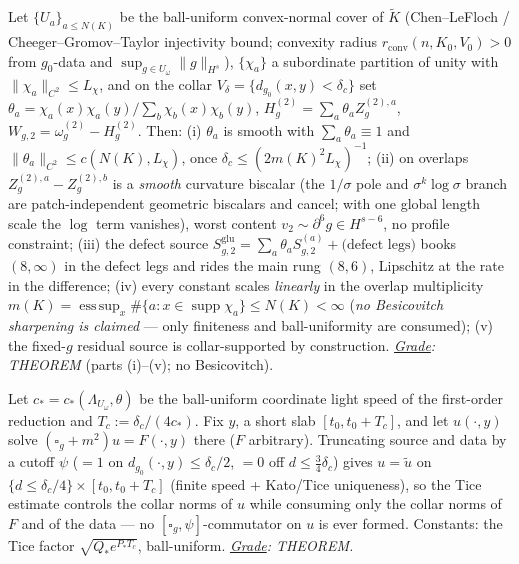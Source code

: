 \begin{lemma}[Collar gluing of the $N{=}2$ parametrix; defect bookkeeping;
honest multiplicity]\label{an17:G}
Let $\{U_a\}_{a\le N(K)}$ be the ball-uniform convex-normal cover of
$\widetilde K$ (Chen--LeFloch / Cheeger--Gromov--Taylor injectivity bound;
convexity radius $r_{\mathrm{conv}}(n,K_0,V_0)>0$ from $g_0$-data and
$\sup_{g\in U_\omega}\|g\|_{H^s}$), $\{\chi_a\}$ a subordinate partition of unity
with $\|\chi_a\|_{C^2}\le L_\chi$, and on the collar
$V_\delta=\{d_{g_0}(x,y)<\delta_c\}$ set
$\theta_a=\chi_a(x)\chi_a(y)/\sum_b\chi_b(x)\chi_b(y)$,
$H^{(2)}_g=\sum_a\theta_a Z^{(2),a}_g$, $W_{g,2}=\omega^{(2)}_g-H^{(2)}_g$. Then:
(i) $\theta_a$ is smooth with $\sum_a\theta_a\equiv1$ and
$\|\theta_a\|_{C^2}\le c(N(K),L_\chi)$, once $\delta_c\le(2m(K)^2 L_\chi)^{-1}$;
(ii) on overlaps $Z^{(2),a}_g-Z^{(2),b}_g$ is a \emph{smooth} curvature biscalar
(the $1/\sigma$ pole and $\sigma^k\log\sigma$ branch are patch-independent
geometric biscalars and cancel; with one global length scale the $\log$ term
vanishes), worst content $v_2\sim\partial^6g\in H^{s-6}$, no profile constraint;
(iii) the defect source $S^{\mathrm{glu}}_{g,2}=\sum_a\theta_aS^{(a)}_{g,2}+
\text{(defect legs)}$ books $(8,\infty)$ in the defect legs and rides the main
rung $(8,6)$, Lipschitz at the rate in the difference; (iv) every constant scales
\emph{linearly} in the overlap multiplicity $m(K)=\operatorname*{ess\,sup}_x
\#\{a:x\in\operatorname{supp}\chi_a\}\le N(K)<\infty$ (\emph{no Besicovitch
sharpening is claimed} --- only finiteness and ball-uniformity are consumed);
(v) the fixed-$g$ residual source is collar-supported by construction.
\emph{\underline{Grade}: THEOREM} (parts (i)--(v); no Besicovitch).
\end{lemma}

\begin{lemma}\label{an17:DoD}
Let $c_*=c_*(\Lambda_{U_\omega},\theta)$ be the ball-uniform coordinate light
speed of the first-order reduction and $T_c:=\delta_c/(4c_*)$. Fix $y$, a short
slab $[t_0,t_0+T_c]$, and let $u(\cdot,y)$ solve $(\square_g+m^2)u=F(\cdot,y)$
there ($F$ arbitrary). Truncating source and data by a cutoff $\psi$ ($=1$ on
$d_{g_0}(\cdot,y)\le\delta_c/2$, $=0$ off $d\le\tfrac34\delta_c$) gives $u=\tilde
u$ on $\{d\le\delta_c/4\}\times[t_0,t_0+T_c]$ (finite speed + Kato/Tice
uniqueness), so the Tice estimate controls the collar norms of $u$ while
consuming only the collar norms of $F$ and of the data --- no
$[\square_g,\psi]$-commutator on $u$ is ever formed. Constants: the Tice factor
$\sqrt{Q_*e^{P_*T_c}}$, ball-uniform. \emph{\underline{Grade}: THEOREM.}
\end{lemma}

